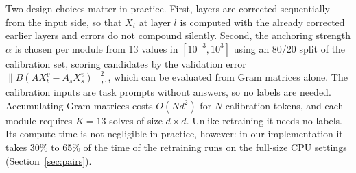 \documentclass[ijoc,nonblindrev]{informs4}
\begin{document}
Two design choices matter in practice. First, layers are corrected sequentially from the input side, so that $X_t$ at
layer $l$ is computed with the already corrected earlier layers and errors do not compound silently. Second, the
anchoring strength $\alpha$ is chosen per module from 13 values in $[10^{-3},10^{3}]$ using an 80/20 split of the
calibration set, scoring candidates by the validation error $\|B(AX_t^{v}-A_sX_s^{v})\|_F^2$, which can be evaluated from
Gram matrices alone. The calibration inputs are task prompts without answers, so no labels are needed.
Accumulating Gram matrices costs $O(Nd^2)$ for $N$ calibration tokens, and each module requires $K=13$ solves of size
$d\times d$. Unlike retraining it needs no labels. Its compute time is not negligible in practice, however: in our
implementation it takes 30\% to 65\% of the time of the retraining runs on the full-size CPU settings (Section~\ref{sec:pairs}).
\end{document}
